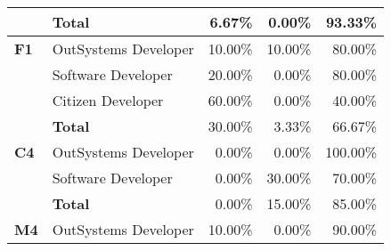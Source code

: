 \begin{table}[tb]
\begin{tabular}{llrrr}
                            & \textbf{Total}       & 6.67\%                                                            & 0.00\%                                                                  & 93.33\%                                                       \\ \hline
  \textbf{F1}               & OutSystems Developer & 10.00\%                                                           & 10.00\%                                                                 & 80.00\%                                                       \\
                            & Software Developer   & 20.00\%                                                           & 0.00\%                                                                  & 80.00\%                                                       \\
                            & Citizen Developer    & 60.00\%                                                           & 0.00\%                                                                  & 40.00\%                                                       \\
                            & \textbf{Total}       & 30.00\%                                                           & 3.33\%                                                                  & 66.67\%                                                       \\ \hline
  \textbf{C4}               & OutSystems Developer & 0.00\%                                                            & 0.00\%                                                                  & 100.00\%                                                      \\
                            & Software Developer   & 0.00\%                                                            & 30.00\%                                                                 & 70.00\%                                                       \\
                            & \textbf{Total}       & 0.00\%                                                            & 15.00\%                                                                 & 85.00\%                                                       \\ \hline
  \textbf{M4}               & OutSystems Developer & 10.00\%                                                           & 0.00\%                                                                  & 90.00\%                                                       \\

\end{tabular}
\end{table}
